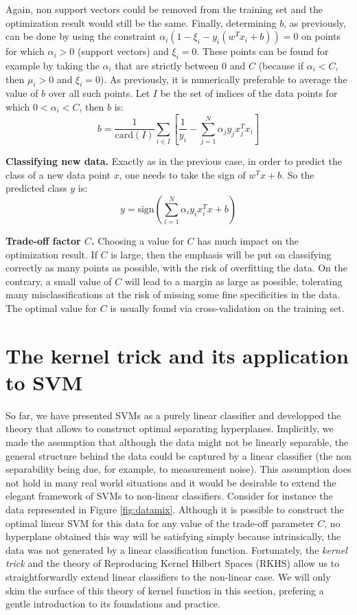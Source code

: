 \documentclass{article}
\begin{document}
Again, non support vectors could be removed from the training set and the optimization result would still be the same. Finally, determining $b$, as previously, can be done by using the constraint $\alpha_i\left(1-\xi_i-y_i\left( w^Tx_i + b \right)\right)=0$ on points for which $\alpha_i>0$ (support vectors) and $\xi_i=0$. These points can be found for example by taking the $\alpha_i$ that are strictly between 0 and $C$ (because if $\alpha_i<C$, then $\mu_i>0$ and $\xi_i=0$). As previously, it is numerically preferable to average the value of $b$ over all such points. Let $I$ be the set of indices of the data points for which $0<\alpha_i<C$, then $b$ is:
\begin{equation*}
b = \frac{1}{\text{card}(I)} \sum_{i \in I} \left[ \frac{1}{y_i} - \sum_{j=1}^N \alpha_j y_j x_j^T x_i \right]
\end{equation*}

\textbf{Classifying new data.} Exactly as in the previous case, in order to predict the class of a new data point $x$, one needs to take the sign of $w^Tx+b$. So the predicted class $y$ is:
\begin{equation*}
y = \text{sign}\left( \sum_{i=1}^N \alpha_i y_i x_i^T x + b \right)
\end{equation*}

\textbf{Trade-off factor $C$.} Choosing a value for $C$ has much impact on the optimization result. If $C$ is large, then the emphasis will be put on classifying correctly as many points as possible, with the risk of overfitting the data. On the contrary, a small value of $C$ will lead to a margin as large as possible, tolerating many misclassifications at the risk of missing some fine specificities in the data. The optimal value for $C$ is usually found via cross-validation on the training set.

\section*{The kernel trick and its application to SVM}

So far, we have presented SVMs as a purely linear classifier and developped the theory that allows to construct optimal separating hyperplanes. Implicitly, we made the assumption that although the data might not be linearly separable, the general structure behind the data could be captured by a linear classifier (the non separability being due, for example, to measurement noise). This assumption does not hold in many real world situations and it would be desirable to extend the elegant framework of SVMs to non-linear classifiers. Consider for instance the data represented in Figure \ref{fig:datamix}. Although it is possible to construct the optimal linear SVM for this data for any value of the trade-off parameter $C$, no hyperplane obtained this way will be satisfying simply because intrinsically, the data was not generated by a linear classification function. Fortunately, the \emph{kernel trick} and the theory of Reproducing Kernel Hilbert Spaces (RKHS) allow us to straightforwardly extend linear classifiers to the non-linear case. We will only skim the surface of this theory of kernel function in this section, prefering a gentle introduction to its foundations and practice.
\end{document}
